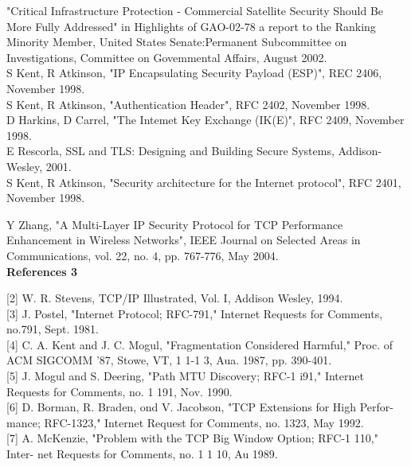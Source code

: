 \documentclass{uathesis}
\begin{document}
\noindent [7] "Critical Infrastructure Protection - Commercial Satellite Security Should Be More Fully Addressed" in Highlights of GAO-02-78 a report to the Ranking Minority Member, United States Senate:Permanent Subcommittee on Investigations, Committee on Govemmental Affairs, August 2002.\\

\noindent [8] S Kent, R Atkinson, "IP Encapsulating Security Payload (ESP)", REC 2406, November 1998.\\

\noindent [9] S Kent, R Atkinson, "Authentication Header", RFC 2402, November 1998.\\

\noindent [10] D Harkins, D Carrel, "The Intemet Key Exchange (IK(E)", RFC 2409, November 1998.\\

\noindent [11] E Rescorla, SSL and TLS: Designing and Building Secure Systems, Addison-Wesley, 2001.\\

\noindent [14] S Kent, R Atkinson, "Security architecture for the Internet protocol", RFC 2401, November 1998.

\noindent [15] Y Zhang, "A Multi-Layer IP Security Protocol for TCP Performance Enhancement in Wireless Networks", IEEE Journal on Selected Areas in Communications, vol. 22, no. 4, pp. 767-776, May 2004.\\

\textbf{References 3} 


[2] W. R. Stevens, TCP/IP Illustrated, Vol. I, Addison Wesley, 1994.\\

[3] J. Postel, "Internet Protocol; RFC-791," Internet Requests for Comments, no.791, Sept. 1981.\\

[4] C. A. Kent and J. C. Mogul, "Fragmentation Considered Harmful," Proc. of
ACM SIGCOMM '87, Stowe, VT, 1 1-1 3, Aua. 1987, pp. 390-401.\\

[5] J. Mogul and S. Deering, "Path MTU Discovery; RFC-1 i91," Internet Requests for Comments, no. 1 191, Nov. 1990.\\

[6] D. Borman, R. Braden, ond V. Jacobson, "TCP Extensions for High Perfor-
mance; RFC-1323," Internet Request for Comments, no. 1323, May 1992.\\

[7] A. McKenzie, "Problem with the TCP Big Window Option; RFC-1 110," Inter-
net Requests for Comments, no. 1 1 10, Au 1989. \\
\end{document}
